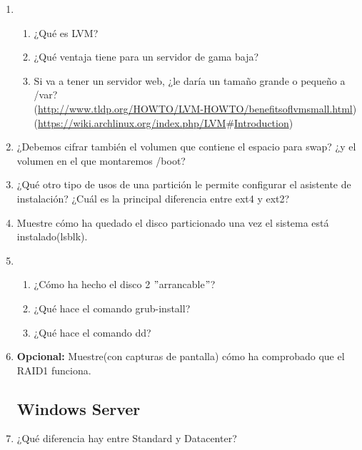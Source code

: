 \documentclass[paper=a4, fontsize=11pt]{scrartcl} %
\numberwithin{equation}{section} %
\numberwithin{figure}{section} %
\numberwithin{table}{section} %
\begin{document}
\begin{enumerate}
		
		\item \begin{enumerate}
			\item ¿Qué es LVM?
			
			\item ¿Qué ventaja tiene para un servidor de gama baja?
			
			\item Si va a tener un servidor web, ¿le daría un tamaño grande o pequeño a /var?\\
			(\href{http://www.tldp.org/HOWTO/LVM-HOWTO/benefitsoflvmsmall.html}
			{http://www.tldp.org/HOWTO/LVM-HOWTO/benefitsoflvmsmall.html})
			(\href{https://wiki.archlinux.org/index.php/LVM#Introduction}
			{https://wiki.archlinux.org/index.php/LVM$\#$Introduction})\\
		\end{enumerate}
		
		\item ¿Debemos cifrar también el volumen que contiene el espacio para swap? ¿y el volumen
		en el que montaremos /boot?
		
		\item ¿Qué otro tipo de usos de una partición le permite configurar el asistente de instalación?
		¿Cuál es la principal diferencia entre ext4 y ext2?
		
		\item Muestre cómo ha quedado el disco particionado una vez el sistema está instalado(lsblk).
		
		\item \begin{enumerate}
			\item ¿Cómo ha hecho el disco 2 $"$arrancable$"$?
			
			\item ¿Qué hace el comando grub-install?
			
			\item ¿Qué hace el comando dd?
		\end{enumerate}
		
		\item \textbf{Opcional:} Muestre(con capturas de pantalla) cómo ha comprobado que el RAID1
		funciona.
		
	\subsection{Windows Server}
		\item ¿Qué diferencia hay entre Standard y Datacenter?
		

\end{enumerate}
\end{document}
